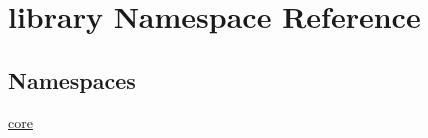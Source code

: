 \hypertarget{namespacelibrary}{}\section{library Namespace Reference}
\label{namespacelibrary}
\subsection*{Namespaces}
\begin{DoxyCompactItemize}
\item 
 \hyperlink{namespacelibrary_1_1core}{core}
\end{DoxyCompactItemize}
